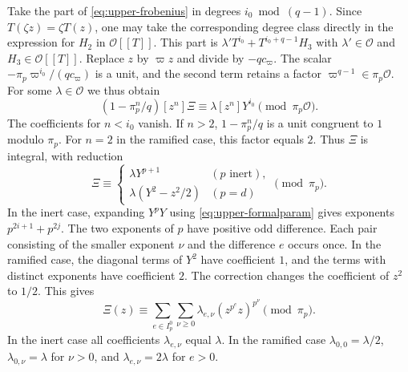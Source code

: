 Take the part of \eqref{eq:upper-frobenius} in degrees
\(i_0\bmod(q-1)\). Since \(T(\zeta z)=\zeta T(z)\), one may take the
corresponding degree class directly in the expression for \(H_2\) in
\(\mathcal O[[T]]\). This part is
\(\lambda' T^{i_0}+T^{i_0+q-1}H_3\) with
\(\lambda'\in\mathcal O\) and \(H_3\in\mathcal O[[T]]\).
Replace \(z\) by \(\varpi z\) and divide by \(-q c_\varpi\).
The scalar \(-\pi_p\varpi^{i_0}/(q c_\varpi)\) is a unit, and the
second term retains a factor \(\varpi^{q-1}\in\pi_p\mathcal O\).
For some \(\lambda\in\mathcal O\) we thus obtain
\[
 (1-\pi_p^n/q)[z^n]\Xi\equiv\lambda[z^n]Y^{i_0}\pmod{\pi_p\mathcal O}.
\]
The coefficients for \(n<i_0\) vanish. If \(n>2\),
\(1-\pi_p^n/q\) is a unit congruent to \(1\) modulo \(\pi_p\).
For \(n=2\) in the ramified case, this factor equals \(2\).
Thus \(\Xi\) is integral, with reduction
\[
 \Xi\equiv
 \begin{cases}
    \lambda Y^{p+1}& (p\text{ inert}),\\
    \lambda(Y^2-z^2/2)& (p=d)
 \end{cases}
 \pmod{\pi_p}.
\]
In the inert case, expanding \(Y^pY\) using \eqref{eq:upper-formalparam}
gives exponents \(p^{2i+1}+p^{2j}\). The two exponents of \(p\) have
positive odd difference. Each pair consisting of the smaller exponent
\(\nu\) and the difference \(e\) occurs once. In the ramified case,
the diagonal terms of \(Y^2\) have coefficient \(1\), and the terms
with distinct exponents have coefficient \(2\). The correction changes
the coefficient of \(z^2\) to \(1/2\).
This gives
\[
  \Xi(z)\equiv
  \sum_{e\in I_p^0}\sum_{\nu\ge0}\lambda_{e,\nu}(z^{p^e}z)^{p^\nu}
  \pmod{\pi_p}.
\]
In the inert case all coefficients \(\lambda_{e,\nu}\) equal \(\lambda\).
In the ramified case \(\lambda_{0,0}=\lambda/2\),
\(\lambda_{0,\nu}=\lambda\) for \(\nu>0\), and \(\lambda_{e,\nu}=2\lambda\)
for \(e>0\).

